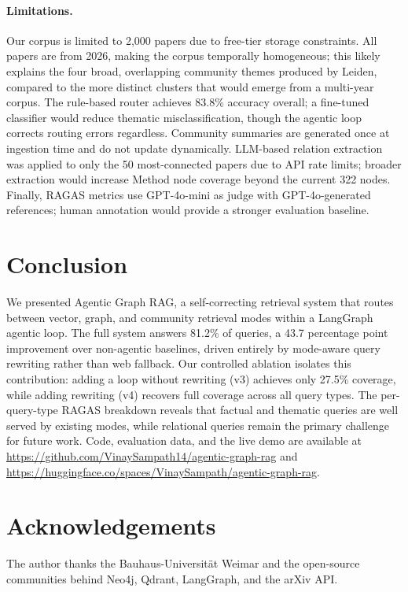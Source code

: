 \documentclass[11pt]{article}
\begin{document}
\paragraph{Limitations.}
\label{sec:limitations}
Our corpus is limited to 2,000 papers due to free-tier storage constraints.
All papers are from 2026, making the corpus temporally homogeneous; this
likely explains the four broad, overlapping community themes produced by
Leiden, compared to the more distinct clusters that would emerge from a
multi-year corpus. The rule-based router achieves 83.8\% accuracy overall;
a fine-tuned classifier would reduce thematic misclassification, though the
agentic loop corrects routing errors regardless. Community summaries are
generated once at ingestion time and do not update dynamically. LLM-based
relation extraction was applied to only the 50 most-connected papers due to
API rate limits; broader extraction would increase Method node coverage
beyond the current 322 nodes. Finally, RAGAS metrics use GPT-4o-mini as
judge with GPT-4o-generated references; human annotation would provide a
stronger evaluation baseline.

\section{Conclusion}
\label{sec:conclusion}

We presented Agentic Graph RAG, a self-correcting retrieval system that
routes between vector, graph, and community retrieval modes within a
LangGraph agentic loop. The full system answers 81.2\% of queries, a 43.7
percentage point improvement over non-agentic baselines, driven entirely by
mode-aware query rewriting rather than web fallback. Our controlled ablation
isolates this contribution: adding a loop without rewriting (v3) achieves
only 27.5\% coverage, while adding rewriting (v4) recovers full coverage
across all query types. The per-query-type RAGAS breakdown reveals that
factual and thematic queries are well served by existing modes, while
relational queries remain the primary challenge for future work. Code,
evaluation data, and the live demo are available at
\url{https://github.com/VinaySampath14/agentic-graph-rag} and
\url{https://huggingface.co/spaces/VinaySampath/agentic-graph-rag}.

\section*{Acknowledgements}

The author thanks the Bauhaus-Universit\"{a}t Weimar and the open-source
communities behind Neo4j, Qdrant, LangGraph, and the arXiv API.






\end{document}
